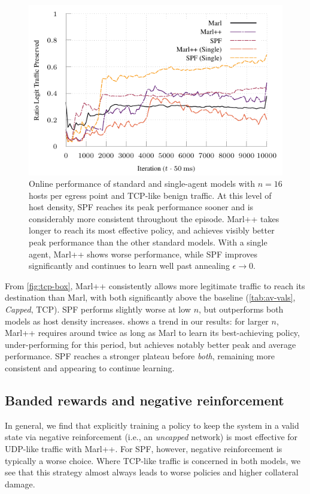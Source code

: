 \documentclass[conference, letterpaper, 10pt, times]{IEEEtran}
\begin{document}
\begin{figure}
	\centering
	\includegraphics[width=0.95\linewidth]{../plots/tcp-16-single}
	
	\caption{
		Online performance of standard and single-agent models with $n=16$ hosts per egress point and TCP-like benign traffic.
		At this level of host density, SPF reaches its peak performance sooner and is considerably more consistent throughout the episode.
		Marl++ takes longer to reach its most effective policy, and achieves visibly better peak performance than the other standard models.
		With a single agent, Marl++ shows worse performance, while SPF improves significantly and continues to learn well past annealing $\epsilon \rightarrow 0$.
		\label{fig:tcp-16}
	}
\end{figure}

From \cref{fig:tcp-box}, Marl++ consistently allows more legitimate traffic to reach its destination than Marl, with both significantly above the baseline (\cref{tab:av-vals}, \emph{Capped}, TCP).
SPF performs slightly worse at low $n$, but outperforms both models as host density increases.
 shows a trend in our results: for larger $n$, Marl++ requires around twice as long as Marl to learn its best-achieving policy, under-performing for this period, but achieves notably better peak and average performance.
SPF reaches a stronger plateau before \emph{both}, remaining more consistent and appearing to continue learning.

\subsection{Banded rewards and negative reinforcement}
In general, we find that explicitly training a policy to keep the system in a valid state via negative reinforcement (i.e., an \emph{uncapped} network) is most effective for UDP-like traffic with Marl++.
For SPF, however, negative reinforcement is typically a worse choice.
Where TCP-like traffic is concerned in both models, we see that this strategy almost always leads to worse policies and higher collateral damage.
\end{document}
